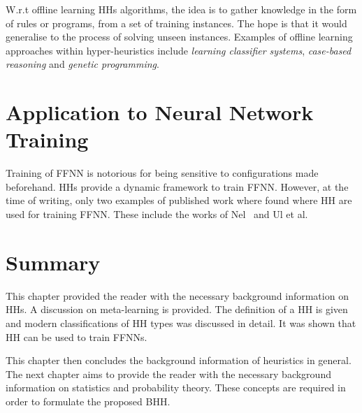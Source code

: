 W.r.t offline learning \acp{HH} algorithms, the idea is to gather knowledge in the form of rules or programs, from a set of training instances. The hope is that it would generalise to the process of solving unseen instances. Examples of offline learning approaches within hyper-heuristics include \textit{learning classifier systems}, \textit{case-based reasoning} and \textit{genetic programming}.


\section{Application to Neural Network Training}
\label{sec:hh:application_to_nn_training}

Training of \ac{FFNN} is notorious for being sensitive to configurations made beforehand. \acp{HH} provide a dynamic framework to train \ac{FFNN}. However, at the time of writing, only two examples of published work where found where \ac{HH} are used for training \ac{FFNN}. These include the works of Nel~\cite{ref:nel:2021} and Ul et al.~\cite{ref:ul:2018}


\section{Summary}
\label{sec:hh:summary}

This chapter provided the reader with the necessary background information on \acp{HH}. A discussion on meta-learning is provided. The definition of a \ac{HH} is given and modern classifications of \ac{HH} types was discussed in detail. It was shown that \ac{HH} can be used to train \acp{FFNN}.

This chapter then concludes the background information of heuristics in general. The next chapter aims to provide the reader with the necessary background information on statistics and probability theory. These concepts are required in order to formulate the proposed \ac{BHH}.